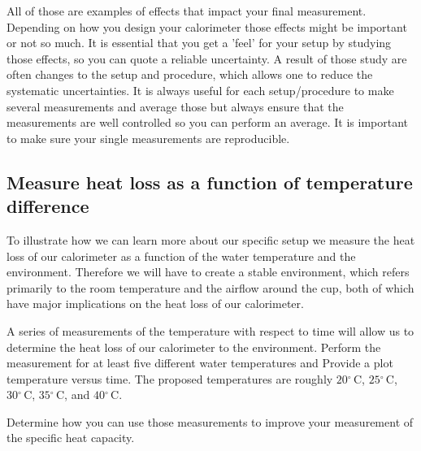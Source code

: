 \documentclass[10pt,aps,twocolumn,secnumarabic,balancelastpage,amsmath,amssymb,nofootinbib,floatfix]{revtex4}
\newcommand{\C}{\ensuremath{^\circ\,\text{C}}}
\begin{document}
All of those are examples of effects that impact your final measurement. Depending on how you design your calorimeter those effects might be important or not so much. It is essential that you get a 'feel' for your setup by studying those effects, so you can quote a reliable uncertainty. A result of those study are often changes to the setup and procedure, which allows one to reduce the systematic uncertainties. It is always useful for each setup/procedure to make several measurements and average those but always ensure that the measurements are well controlled so you can perform an average. It is important to make sure your single measurements are reproducible.

\subsection{Measure heat loss as a function of temperature difference}

To illustrate how we can learn more about our specific setup we measure the heat loss of our calorimeter as a function of the water temperature and the environment. Therefore we will have to create a stable environment, which refers primarily to the room temperature and the airflow around the cup, both of which have major implications on the heat loss of our calorimeter.

A series of measurements of the temperature with respect to time will allow us to determine the heat loss of our calorimeter to the environment. Perform the measurement for at least five different water temperatures and Provide a plot temperature versus time. The proposed temperatures are roughly $20\C$, $25\C$, $30\C$, $35\C$, and $40\C$.

Determine how you can use those measurements to improve your measurement of the specific heat capacity.


\end{document}
